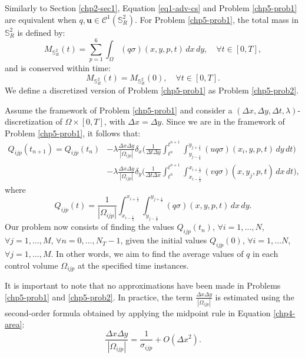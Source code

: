 Similarly to Section \ref{chp2-sec1}, Equation \eqref{eq1-adv-cs} and Problem \eqref{chp5-prob1} are equivalent
when ${q}, \boldsymbol{u} \in \mathcal{C}^1(\mathbb{S}^2_R)$.
For Problem \ref{chp5-prob1}, the total mass in $\mathbb{S}^2_R$ is defined by: 
\begin{equation}
	{M}_{\mathbb{S}^2_R}(t) = \sum_{p=1}^6 \int_{\Omega} {(q\sigma)}(x,y,p,t) \,dx \,dy , \quad \forall t \in [0,T],
\end{equation}
and is conserved within time: 
\begin{equation}
	{M}_{\mathbb{S}^2_R}(t) = {M}_{\mathbb{S}^2_R}(0), \quad \forall t \in [0,T].
\end{equation}
We define a discretized version of Problem \eqref{chp5-prob1} as Problem \eqref{chp5-prob2}.
\begin{prob}
	\label{chp5-prob2}
	Assume the framework of Problem \ref{chp5-prob1}
	and consider a $(\Delta x, \Delta y, \Delta t, \lambda)$-discretization of $\Omega\times [0,T]$, with $\Delta x= \Delta y$.
	Since we are in the framework of Problem \ref{chp5-prob1}, it follows that:
	\begin{align*}
		{Q}_{ijp}(t_{n+1})  = {Q}_{ijp}(t_{n})
		&- \lambda \frac{\Delta x  \Delta y}{|\Omega_{ijp}|}
		\delta _x \bigg( \frac{1}{\Delta t \Delta y}
		\int_{t^n}^{t^{n+1}} \int_{y_{j-\frac{1}{2}}}^{y_{j+\frac{1}{2}}} 
		{(uq\sigma)}(x_{i}, y, p, t)
		\,dy \,dt \bigg) \\ \nonumber
		&- \lambda \frac{\Delta x  \Delta y}{|\Omega_{ijp}|}
		\delta _y \bigg( \frac{1}{\Delta t \Delta x}
		\int_{t^n}^{t^{n+1}} \int_{x_{i-\frac{1}{2}}}^{x_{i+\frac{1}{2}}} 
		{(vq\sigma)}(x, y_{j}, p, t)
		\,dx \,dt \bigg),
	\end{align*}
	where
	\begin{equation}
	 {Q}_{ijp}(t) = \frac{1}{|\Omega_{ijp}|}
	\int_{x_{i-\frac{1}{2}}}^{x_{i+\frac{1}{2}}} 
	\int_{y_{j-\frac{1}{2}}}^{y_{j+\frac{1}{2}}} {(q\sigma)}(x,y,p,t) \,dx \,dy.
	\end{equation}
	Our problem now consists of finding the values ${Q}_{ijp}(t_{n})$, 
	$\forall i = 1, \ldots, N$, $\forall j = 1, \ldots, M$, $\forall n = 0, \ldots, N_T-1$,
	given the initial values ${Q}_{ijp}(0)$, $\forall i = 1, \ldots N$, $\forall j = 1, \ldots, M$.
	In other words, we aim to find the average values of ${q}$ in each control volume $\Omega_{ijp}$ at the specified time instances.
\end{prob}
It is important to note that no approximations have been made in Problems \eqref{chp5-prob1} and \eqref{chp5-prob2}. 
In practice, the term $\frac{\Delta x  \Delta y}{|\Omega_{ijp}|}$ is estimated using the second-order
formula obtained by applying the midpoint rule in Equation \eqref{chp4-area}:
\begin{equation}
\frac{\Delta x  \Delta y}{|\Omega_{ijp}|}= \frac{1}{\sigma_{ijp}} + O(\Delta x^2).
\end{equation}

